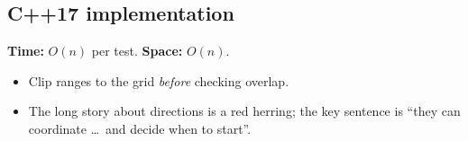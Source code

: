 \subsection*{C++17 implementation}

\begin{complexitybox}
\textbf{Time:} $O(n)$ per test. \textbf{Space:} $O(n)$.
\end{complexitybox}

\begin{pitfallbox}
\begin{itemize}
  \item Clip ranges to the grid \emph{before} checking overlap.
  \item The long story about directions is a red herring; the key sentence
        is ``they can coordinate \dots\ and decide when to start''.
\end{itemize}
\end{pitfallbox}

